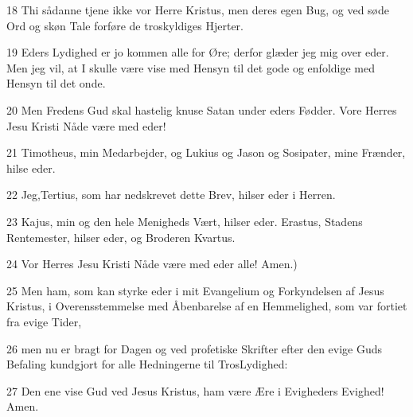 \par 18 Thi sådanne tjene ikke vor Herre Kristus, men deres egen Bug, og ved søde Ord og skøn Tale forføre de troskyldiges Hjerter.
\par 19 Eders Lydighed er jo kommen alle for Øre; derfor glæder jeg mig over eder. Men jeg vil, at I skulle være vise med Hensyn til det gode og enfoldige med Hensyn til det onde.
\par 20 Men Fredens Gud skal hastelig knuse Satan under eders Fødder. Vore Herres Jesu Kristi Nåde være med eder!
\par 21 Timotheus, min Medarbejder, og Lukius og Jason og Sosipater, mine Frænder, hilse eder.
\par 22 Jeg,Tertius, som har nedskrevet dette Brev, hilser eder i Herren.
\par 23 Kajus, min og den hele Menigheds Vært, hilser eder. Erastus, Stadens Rentemester, hilser eder, og Broderen Kvartus.
\par 24 Vor Herres Jesu Kristi Nåde være med eder alle! Amen.)
\par 25 Men ham, som kan styrke eder i mit Evangelium og Forkyndelsen af Jesus Kristus, i Overensstemmelse med Åbenbarelse af en Hemmelighed, som var fortiet fra evige Tider,
\par 26 men nu er bragt for Dagen og ved profetiske Skrifter efter den evige Guds Befaling kundgjort for alle Hedningerne til TrosLydighed:
\par 27 Den ene vise Gud ved Jesus Kristus, ham være Ære i Evigheders Evighed! Amen.



